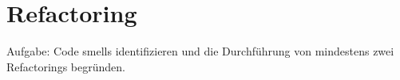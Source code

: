 \chapter{Refactoring}
Aufgabe: Code smells identifizieren und die Durchführung von mindestens zwei Refactorings begründen.